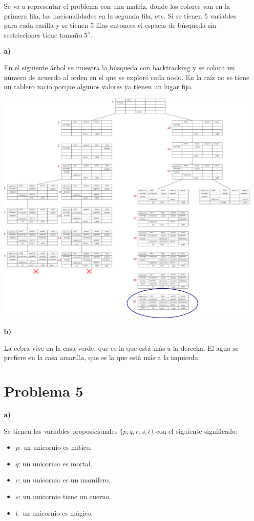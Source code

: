 \documentclass{article}
\begin{document}
Se va a representar el problema con una matriz, donde los colores van en la primera fila, las nacionalidades en la segunda fila, etc. Si se tienen 5 variables para cada casilla y se tienen 5 filas entonces el espacio de búsqueda sin restricciones tiene tamaño $5^5$.

\textbf{a)}

En el siguiente árbol se muestra la búsqueda con backtracking y se coloca un número de acuerdo al orden en el que se exploró cada nodo. En la raíz no se tiene un tablero vacío porque algunos valores ya tienen un lugar fijo.

\includegraphics[width=\linewidth]{acertijo}

\textbf{b)}

La cebra vive en la casa verde, que es la que está más a la derecha. El agua se prefiere en la casa amarilla, que es la que está más a la izquierda.

\section*{Problema 5}

\textbf{a)}

Se tienen las variables proposicionales $\{p, q, r, s, t\}$ con el siguiente significado:

\begin{itemize}
\item $p$: un unicornio es mítico.
\item $q$: un unicornio es mortal.
\item $r$: un unicornio es un mamífero.
\item $s$: un unicornio tiene un cuerno.
\item $t$: un unicornio es mágico.
\end{itemize}
\end{document}
